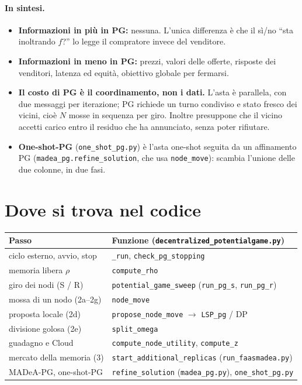 \documentclass[11pt,a4paper]{article}
\newcommand{\code}[1]{\texttt{#1}}
\begin{document}
\paragraph{In sintesi.}
\begin{itemize}
\item \textbf{Informazioni in pi\`u in PG:} nessuna. L'unica differenza \`e
  che il s\`i/no ``sta inoltrando $f$?'' lo legge il compratore invece del
  venditore.
\item \textbf{Informazioni in meno in PG:} prezzi, valori delle offerte,
  risposte dei venditori, latenza ed equit\`a, obiettivo globale per fermarsi.
\item \textbf{Il costo di PG \`e il coordinamento, non i dati.} L'asta \`e
  parallela, con due messaggi per iterazione; PG richiede un turno condiviso
  e stato fresco dei vicini, cio\`e $N$ mosse in sequenza per giro. Inoltre
  presuppone che il vicino accetti carico entro il residuo che ha
  annunciato, senza poter rifiutare.
\item \textbf{One-shot-PG} (\code{one\_shot\_pg.py}) \`e l'asta one-shot
  seguita da un affinamento PG (\code{madea\_pg.refine\_solution}, che usa
  \code{node\_move}): scambia l'unione delle due colonne, in due fasi.
\end{itemize}

\section{Dove si trova nel codice}

\begin{center}
\begin{tabular}{@{}ll@{}}
\toprule
Passo & Funzione (\code{decentralized\_potentialgame.py}) \\
\midrule
ciclo esterno, avvio, stop & \code{\_run}, \code{check\_pg\_stopping} \\
memoria libera $\rho$ & \code{compute\_rho} \\
giro dei nodi (S / R) & \code{potential\_game\_sweep} (\code{run\_pg\_s}, \code{run\_pg\_r}) \\
mossa di un nodo (2a--2g) & \code{node\_move} \\
proposta locale (2d) & \code{propose\_node\_move} $\to$ \code{LSP\_pg} / DP \\
divisione golosa (2e) & \code{split\_omega} \\
guadagno e Cloud & \code{compute\_node\_utility}, \code{compute\_z} \\
mercato della memoria (3) & \code{start\_additional\_replicas} (\code{run\_faasmadea.py}) \\
MADeA-PG, one-shot-PG & \code{refine\_solution} (\code{madea\_pg.py}), \code{one\_shot\_pg.py} \\
\bottomrule
\end{tabular}
\end{center}
\end{document}
